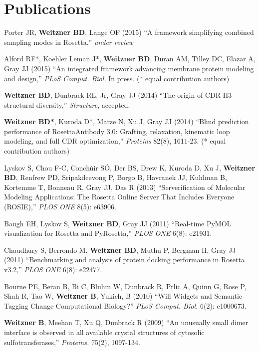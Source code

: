 \documentclass[11pt]{article}
\newcommand{\allcapsspacing}[1]{{\addfontfeature{LetterSpace=7.5}#1}}
\begin{document}
\section*{\allcapsspacing{Publications}}
\begin{etaremune}
\item Porter JR, \textbf{Weitzner BD}, Lange OF (2015) ``A framework simplifying combined sampling modes in Rosetta,'' \textit{under review}
\item Alford RF*, Koehler Leman J*, \textbf{Weitzner BD}, Duran AM, Tilley DC, Elazar A, Gray JJ (2015) ``An integrated framework advancing membrane protein modeling and design,'' \textit{PLoS Comput. Biol.} In press. (* equal contribution authors)
\item \textbf{Weitzner BD}, Dunbrack RL, Jr, Gray JJ (2014) ``The origin of CDR H3 structural diversity,'' \textit{Structure}, accepted.
\item \textbf{Weitzner BD*}, Kuroda D*, Marze N, Xu J, Gray JJ (2014) ``Blind prediction performance of RosettaAntibody 3.0: Grafting, relaxation, kinematic loop modeling, and full CDR optimization,'' \textit{Proteins} 82(8), 1611-23. (* equal contribution authors)
\item Lyskov S, Chou F-C, Conch{\'u}ir S{\'O}, Der BS, Drew K, Kuroda D, Xu J, \textbf{Weitzner BD}, Renfrew PD, Sripakdeevong P, Borgo B, Havranek JJ, Kuhlman B, Kortemme T, Bonneau R, Gray JJ, Das R (2013) ``Serverification of Molecular Modeling Applications: The Rosetta Online Server That Includes Everyone (ROSIE),'' \textit{PLOS ONE} 8(5): e63906.
\item Baugh EH, Lyskov S, \textbf{Weitzner BD}, Gray JJ (2011) ``Real-time PyMOL visualization for Rosetta and PyRosetta,'' \textit{PLOS ONE} 6(8): e21931.
\item Chaudhury S, Berrondo M, \textbf{Weitzner BD}, Muthu P, Bergman H, Gray JJ (2011) ``Benchmarking and analysis of protein docking performance in Rosetta v3.2,'' \textit{PLOS ONE} 6(8): e22477.
\item Bourne PE, Beran B, Bi C, Bluhm W, Dunbrack R, Prlic A, Quinn G, Rose P, Shah R, Tao W, \textbf{Weitzner B}, Yukich, B (2010) ``Will Widgets and Semantic Tagging Change Computational Biology?'' \textit{PLoS Comput. Biol.} 6(2): e1000673.
\item \textbf{Weitzner B}, Meehan T, Xu Q, Dunbrack R (2009) ``An unusually small dimer interface is observed in all available crystal structures of cytosolic sulfotransferases,'' \textit{Proteins.} 75(2), 1097-134.
\end{etaremune}
\end{document}
